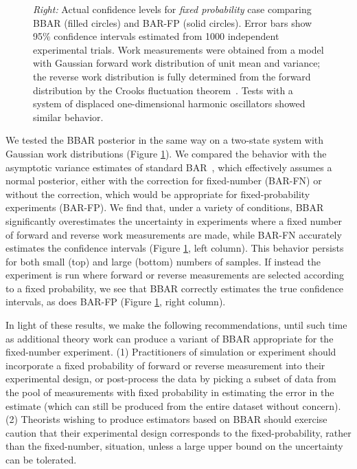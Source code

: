 \documentclass[aps,pre,twocolumn,superscriptaddress,nofootinbib]{revtex4}
\begin{document}
\begin{figure}[htb]
{  \emph{Right:} Actual confidence levels for \emph{fixed probability} case comparing BBAR (filled circles) and BAR-FP (solid circles).
  Error bars show 95\% confidence intervals estimated from 1000 independent experimental trials.
  Work measurements were obtained from a model with Gaussian forward work distribution of unit mean and variance; the reverse work distribution is fully determined from the forward distribution by the Crooks fluctuation theorem~\cite{crooks:pre:1999:cft}.
  Tests with a system of displaced one-dimensional harmonic oscillators showed similar behavior.
  }
  \label{figure:bbar-test}
\end{figure}

We tested the BBAR posterior in the same way on a two-state system with Gaussian work distributions (Figure \ref{figure:bbar-test}).
We compared the behavior with the asymptotic variance estimates of standard BAR~\cite{bennett:j-comput-phys:1976:bar,shirts:prl:2003:bar,shirts:jcp:2008:mbar}, which effectively assumes a normal posterior, either with the correction for fixed-number (BAR-FN) or without the correction, which would be appropriate for fixed-probability experiments (BAR-FP).
We find that, under a variety of conditions, BBAR significantly overestimates the uncertainty in experiments where a fixed number of forward and reverse work measurements are made, while BAR-FN accurately estimates the confidence intervals (Figure \ref{figure:bbar-test}, left column).
This behavior persists for both small (top) and large (bottom) numbers of samples.
If instead the experiment is run where forward or reverse measurements are selected according to a fixed probability, we see that BBAR correctly estimates the true confidence intervals, as does BAR-FP (Figure \ref{figure:bbar-test}, right column).

In light of these results, we make the following recommendations, until such time as additional theory work can produce a variant of BBAR appropriate for the fixed-number experiment.
(1) Practitioners of simulation or experiment should incorporate a fixed probability of forward or reverse measurement into their experimental design, or post-process the data by picking a subset of data from the pool of measurements with fixed probability in estimating the error in the estimate (which can still be produced from the entire dataset without concern).
(2) Theorists wishing to produce estimators based on BBAR should exercise caution that their experimental design corresponds to the fixed-probability, rather than the fixed-number, situation, unless a large upper bound on the uncertainty can be tolerated.
\end{document}
